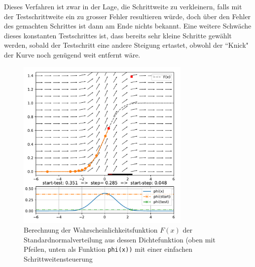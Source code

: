 Dieses Verfahren ist zwar in der Lage, die Schrittweite zu verkleinern, falls mit der Testschrittweite ein zu grosser Fehler resultieren würde,
doch über den Fehler des gemachten Schrittes ist dann am Ende nichts bekannt.
Eine weitere Schwäche dieses konstanten Testschrittes ist, dass bereits sehr kleine Schritte gewählt werden,
sobald der Testschritt eine andere Steigung ertastet, obwohl der ``Knick" der Kurve noch genügend weit entfernt wäre.

\begin{figure}
  \centering
  \includegraphics[width=0.75\textwidth]{papers/steps/img/ssc.pdf}
  \caption{Berechnung der Wahrscheinlichkeitsfunktion $F(x)$ der Standardnormalverteilung aus dessen Dichtefunktion
    (oben mit Pfeilen, unten als Funktion \texttt{phi(x))} mit einer einfachen Schrittweitensteuerung
    \label{buch:steps:examplessc}}
\end{figure}

